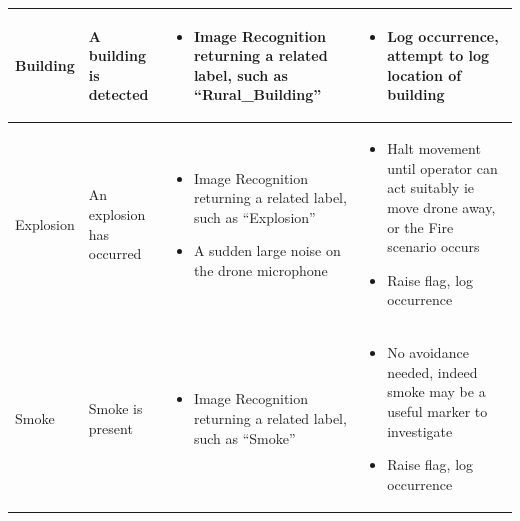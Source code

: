 \documentclass{article}
\begin{document}
\begin{table}[H]
\begin{tabularx}{\textwidth}{| >{\centering}m{1.5cm} | >{\centering}m{2cm} | X | X |}
    Building & \vspace{\baselineskip} A building is detected &
    \begin{itemize} [topsep=0pt, leftmargin=0cm,itemindent=.5cm,labelwidth=\itemindent,labelsep=0cm,align=left]
        \item Image Recognition returning a related label, such as “Rural\_Building”
    \end{itemize} &
    \begin{itemize} [topsep=0pt, leftmargin=0cm,itemindent=.5cm,labelwidth=\itemindent,labelsep=0cm,align=left]
        \item Log occurrence, attempt to log location of building
    \end{itemize} \\ \hline

    Explosion & \vspace{\baselineskip} An explosion has occurred &
    \begin{itemize} [topsep=0pt, leftmargin=0cm,itemindent=.5cm,labelwidth=\itemindent,labelsep=0cm,align=left]
        \item Image Recognition returning a related label, such as “Explosion”
        \item A sudden large noise on the drone microphone
    \end{itemize} &
    \begin{itemize} [topsep=0pt, leftmargin=0cm,itemindent=.5cm,labelwidth=\itemindent,labelsep=0cm,align=left]
        \item Halt movement until operator can act suitably ie move drone away, or the Fire scenario occurs
        \item Raise flag, log occurrence
    \end{itemize} \\ \hline

    Smoke & \vspace{\baselineskip} Smoke is present &
    \begin{itemize} [topsep=0pt, leftmargin=0cm,itemindent=.5cm,labelwidth=\itemindent,labelsep=0cm,align=left]
        \item Image Recognition returning a related label, such as “Smoke”
    \end{itemize} &
    \begin{itemize} [topsep=0pt, leftmargin=0cm,itemindent=.5cm,labelwidth=\itemindent,labelsep=0cm,align=left]
        \item No avoidance needed, indeed smoke may be a useful marker to investigate
        \item Raise flag, log occurrence
    \end{itemize} \\ \hline


\end{tabularx}
\end{table}
\end{document}
